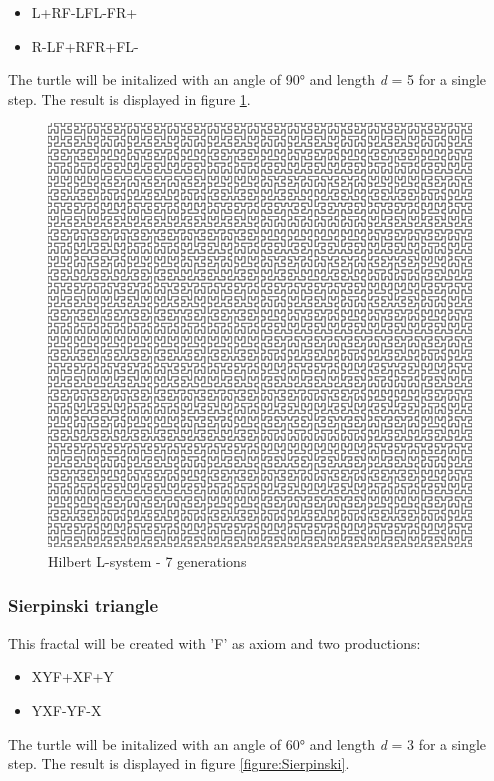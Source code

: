 \documentclass[english]{cpp-hmwk}
\begin{document}
\begin{itemize}
\item L\rightarrow +RF-LFL-FR+
\item R\rightarrow-LF+RFR+FL-
\end{itemize}


\noindent The turtle will be initalized with an angle of 90° and length \textit{d} = 5 for a single step. The result is displayed in figure \ref{figure:Hilbert}.

\begin{figure}[h!]
	\centering
	\includegraphics[width=0.6\columnwidth]{../graphs/hilbert.png}
	\caption{Hilbert L-system - 7 generations}
	\label{figure:Hilbert}
\end{figure}
 

\subsubsection{Sierpinski triangle}
This fractal will be created with 'F' as axiom and two productions:

\begin{itemize}
\item X\rightarrow YF+XF+Y
\item Y\rightarrow XF-YF-X
\end{itemize}

\noindent The turtle will be initalized with an angle of 60° and length \textit{d} = 3 for a single step. The result is displayed in figure \ref{figure:Sierpinski}.
 
\end{document}
